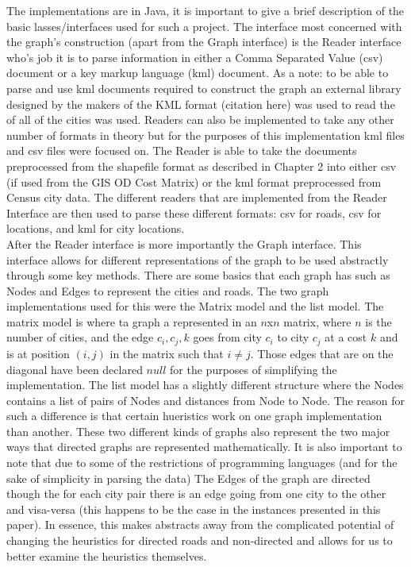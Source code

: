 \documentclass[midd]{thesis}
\newcommand{\tab}{\hspace*{2em}}
\begin{document}
\tab The implementations are in Java, it is important to give a brief description of the basic lasses/interfaces used for such a project. The interface most concerned with the graph's construction (apart from the Graph interface) is the Reader interface who's job it is to parse information in either a Comma Separated Value (csv) document or a key markup language (kml) document. As a note: to be able to parse and use kml documents required to construct the graph an external library designed by the makers of the KML format (citation here) was used to read the of all of the cities was used. Readers can also be implemented to take any other number of formats in theory but for the purposes of this implementation kml files and csv files were focused on. The Reader is able to take the documents preprocessed from the shapefile format as described in Chapter 2 into either csv (if used from the GIS OD Cost Matrix) or the kml format preprocessed from Census city data. The different readers that are implemented from the Reader Interface are then used to parse these different formats: csv for roads, csv for locations, and kml for city locations.\\
\tab After the Reader  interface is more importantly the Graph interface. This interface allows for different representations of the graph to be used abstractly through some key methods. There are some basics that each graph has such as Nodes and Edges to represent the cities and roads. The two graph implementations used for this were the Matrix model and the list model. The matrix model is where ta graph a represented in an $n$x$n$ matrix, where $n$ is the number of cities, and the edge $c_i,c_j,k$ goes from city $c_i$ to city $c_j$ at a cost $k$ and is at position $(i,j)$ in the matrix such that $i \neq j$. Those edges that are on the diagonal have been declared $null$ for the purposes of simplifying the implementation. The list model has a slightly different structure where the Nodes contains a list of pairs of Nodes and distances from Node to Node. The reason for such a difference is that certain hueristics work on one graph implementation than another. These two different kinds of graphs also represent the two major ways that directed graphs are represented mathematically. It is also important to note that due to some of the restrictions of programming languages (and for the sake of simplicity in parsing the data) The Edges of the graph are directed though the for each city pair there is an edge going from one city to the other and visa-versa (this happens to be the case in the instances presented in this paper). In essence, this makes abstracts away from the complicated potential of changing the heuristics for directed roads and non-directed and allows for us to better examine the heuristics themselves.\\
\end{document}
